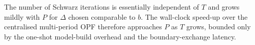 \noindent The number of Schwarz iterations is essentially independent of
$T$ and grows mildly with $P$ for $\Delta$ chosen comparable to $b$. The
wall-clock speed-up over the centralised multi-period OPF therefore
approaches $P$ as $T$ grows, bounded only by the one-shot model-build
overhead and the boundary-exchange latency.
